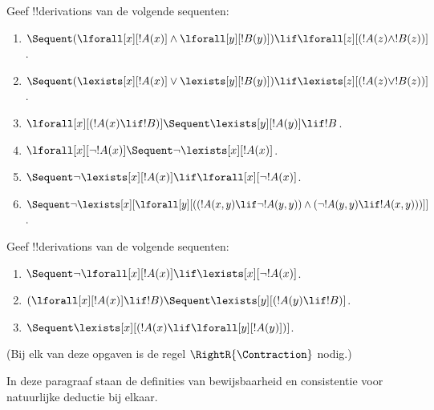 \documentclass[openany]{memoir}
\begin{document}
\begin{prob}
Geef !!{derivation}s van de volgende sequenten:
\begin{enumerate}
\item $\Sequent (\lforall[x][!A(x)] \land \lforall[y][!B(y)]) \lif
\lforall[z][(!A(z) \land !B(z))]$.
\item $\Sequent (\lexists[x][!A(x)] \lor \lexists[y][!B(y)]) \lif
\lexists[z][(!A(z) \lor !B(z))]$.
\item $\lforall[x][(!A(x) \lif !B)] \Sequent \lexists[y][!A(y)] \lif !B$.
\item $\lforall[x][\lnot !A(x)] \Sequent \lnot\lexists[x][!A(x)]$.
\item $\Sequent \lnot\lexists[x][!A(x)] \lif \lforall[x][\lnot !A(x)]$.
\item $\Sequent \lnot\lexists[x][\lforall[y][((!A(x,y) \lif \lnot
!A(y,y)) \land (\lnot !A(y,y) \lif !A(x,y)))]]$.
\end{enumerate}
\end{prob}

\begin{prob}
Geef !!{derivation}s van de volgende sequenten:
\begin{enumerate}
\item $\Sequent \lnot\lforall[x][!A(x)] \lif \lexists[x][\lnot!A(x)]$.
\item $(\lforall[x][!A(x)] \lif !B) \Sequent \lexists[y][(!A(y) \lif !B)]$.
\item $\Sequent \lexists[x][(!A(x) \lif \lforall[y][!A(y)])]$.
\end{enumerate}
(Bij elk van deze opgaven is de regel $\RightR{\Contraction}$ nodig.)
\end{prob}
\endgroup

\begingroup
\def\olfilename{OLP-0077}
\def\olfilepath{content/first-order-logic/sequent-calculus/}
\hypertarget{unit-OLP-0077}{}



\begin{editorial}
  In deze paragraaf staan de definities van bewijsbaarheid en
  consistentie voor natuurlijke deductie bij elkaar.
\end{editorial}
\end{document}
